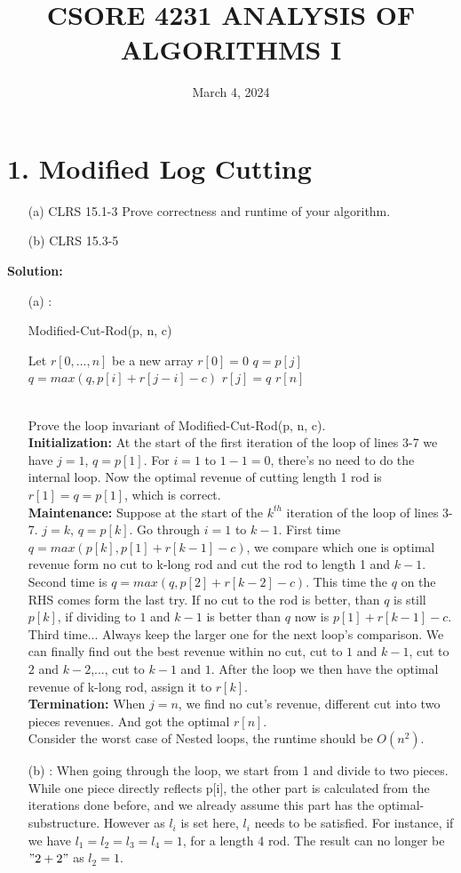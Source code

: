 \documentclass{article}
\title{CSORE 4231 ANALYSIS OF ALGORITHMS I \exerciseset}
\author{\studentname  \qquad \suid}
\date{March 4, 2024}
\begin{document}
\maketitle

\section*{1. Modified Log Cutting}
\begin{enumerate}
    \item[(a)] CLRS 15.1-3 Prove correctness and runtime of your algorithm.
    \item[(b)] CLRS 15.3-5
\end{enumerate}
\textbf{Solution:}
\begin{enumerate}
    \item[(a)]: 
\begin{algorithm}
\caption{Modified-Cut-Rod(p, n, c)}
\begin{algorithmic}[1]
\State Let $r[0,...,n]$ be a new array
\State $r[0]=0$
    \State $q = p[j]$
        \State $q = max(q,p[i]+r[j-i]-c)$
    \EndFor
    \State $r[j]=q$
\EndFor
\State \Return $r[n]$
\end{algorithmic}
\end{algorithm}
\\Prove the loop invariant of Modified-Cut-Rod(p, n, c).\\
\textbf{Initialization:} At the start of the first iteration of the loop of lines 3-7 we have $j=1$, $q=p[1]$. For $i=1$ to $1-1=0$, there's no need to do the internal loop. Now the optimal revenue of cutting length 1 rod is $r[1]=q=p[1]$, which is correct. \\
\textbf{Maintenance:} Suppose at the start of the $k^{th}$ iteration of the loop of lines 3-7. $j=k$, $q=p[k]$. Go through $i=1$ to $k-1$. First time $q=max(p[k], p[1]+r[k-1]-c)$, we compare which one is optimal revenue form no cut to k-long rod and cut the rod to length 1 and $k-1$. Second time is $q=max(q, p[2]+r[k-2]-c)$. This time the $q$ on the RHS comes form the last try. If no cut to the rod is better, than $q$ is still $p[k]$, if dividing to $1$ and $k-1$ is better than $q$ now is $p[1]+r[k-1]-c$. Third time... Always keep the larger one for the next loop's comparison. We can finally find out the best revenue within no cut, cut to $1$ and $k-1$, cut to $2$ and $k-2$,..., cut to $k-1$ and $1$. After the loop we then have the optimal revenue of k-long rod, assign it to $r[k]$.\\
\textbf{Termination:} When $j=n$, we find no cut's revenue, different cut into two pieces revenues. And got the optimal $r[n]$.\\
Consider the worst case of Nested loops, the runtime should be $O(n^2)$.
    \item[(b)]: When going through the loop, we start from 1 and divide to two pieces. While one piece directly reflects p[i], the other part is calculated from the iterations done before, and we already assume this part has the optimal-substructure. However as $l_i$ is set here, $l_i$ needs to be satisfied. For instance, if we have $l_1=l_2=l_3=l_4=1$, for a length 4 rod. The result can no longer be $"2+2"$ as $l_2=1$.
\end{enumerate}
\end{document}
